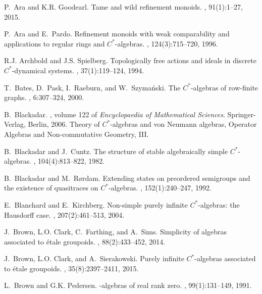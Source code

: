 \documentclass[a4paper, 12pt]{amsart}
\numberwithin{equation}{section}
\theoremstyle{remark}
\theoremstyle{definition}
\begin{document}
\begin{thebibliography}{10}

 P.~Ara and K.R. Goodearl.
\newblock Tame and wild refinement monoids.
, 91(1):1--27, 2015.

 P.~Ara and E.~Pardo.
\newblock Refinement monoids with weak comparability and applications to
  regular rings and {$C^*$}-algebras.
, 124(3):715--720, 1996.

 R.J. Archbold and J.S. Spielberg.
\newblock Topologically free actions and ideals in discrete {$C^*$}-dynamical
  systems.
, 37(1):119--124, 1994.

 T.~Bates, D.~Pask, I.~Raeburn, and W.~Szyma{\'n}ski.
\newblock The {$C^*$}-algebras of row-finite graphs.
, 6:307--324, 2000.

 B.~Blackadar.
, volume 122 of {\em Encyclopaedia of
  Mathematical Sciences}.
\newblock Springer-Verlag, Berlin, 2006.
\newblock Theory of {$C^*$}-algebras and von Neumann algebras, Operator
  Algebras and Non-commutative Geometry, III.

 B.~Blackadar and J.~Cuntz.
\newblock The structure of stable algebraically simple {$C^*$}-algebras.
, 104(4):813--822, 1982.

 B.~Blackadar and M.~R{\o}rdam.
\newblock Extending states on preordered semigroups and the existence of
  quasitraces on {$C^*$}-algebras.
, 152(1):240--247, 1992.

 E.~Blanchard and E.~Kirchberg.
\newblock Non-simple purely infinite {$C^*$}-algebras: the {H}ausdorff case.
, 207(2):461--513, 2004.

 J.~Brown, L.O. Clark, C.~Farthing, and A.~Sims.
\newblock Simplicity of algebras associated to \'etale groupoids.
, 88(2):433--452, 2014.

 J.~Brown, L.O. Clark, and A.~Sierakowski.
\newblock Purely infinite {$C^*$}-algebras associated to \'etale groupoids.
, 35(8):2397--2411, 2015.

 L.~Brown and G.K. Pedersen.
-algebras of real rank zero.
, 99(1):131--149, 1991.


\end{thebibliography}
\end{document}
